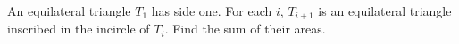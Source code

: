 An equilateral triangle $T_1$ has side one. For each $i$, $T_{i+1}$ is an equilateral triangle inscribed in the incircle of $T_i$. Find the sum of their areas.
